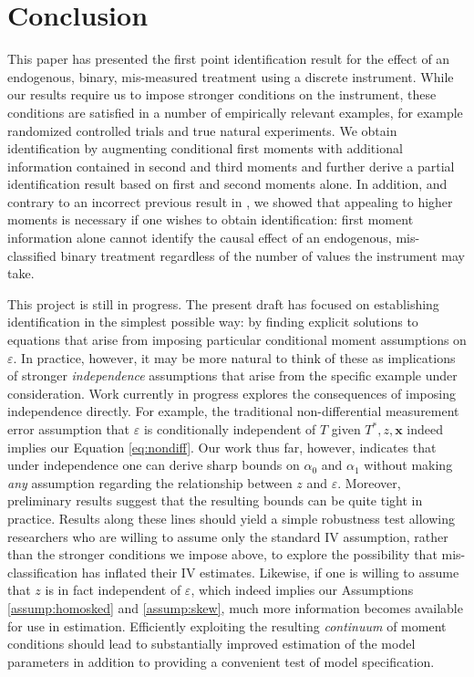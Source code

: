 \section{Conclusion}
This paper has presented the first point identification result for the effect of an endogenous, binary, mis-measured treatment using a discrete instrument.
While our results require us to impose stronger conditions on the instrument, these conditions are satisfied in a number of empirically relevant examples, for example randomized controlled trials and true natural experiments.
We obtain identification by augmenting conditional first moments with additional information contained in second and third moments and further derive a partial identification result based on first and second moments alone.
In addition, and contrary to an incorrect previous result in \cite{Mahajan}, we showed that appealing to higher moments is necessary if one wishes to obtain identification: first moment information alone cannot identify the causal effect of an endogenous, mis-classified binary treatment regardless of the number of values the instrument may take.

This project is still in progress.
The present draft has focused on establishing identification in the simplest possible way: by finding explicit solutions to equations that arise from imposing particular conditional moment assumptions on $\varepsilon$.
In practice, however, it may be more natural to think of these as implications of stronger \emph{independence} assumptions that arise from the specific example under consideration.
Work currently in progress explores the consequences of imposing independence directly.
For example, the traditional non-differential measurement error assumption that $\varepsilon$ is conditionally independent of $T$ given $T^*,z, \mathbf{x}$ indeed implies our Equation \ref{eq:nondiff}.
Our work thus far, however, indicates that under independence one can derive sharp bounds on $\alpha_0$ and $\alpha_1$ without making \emph{any} assumption regarding the relationship between $z$ and $\varepsilon$.
Moreover, preliminary results suggest that the resulting bounds can be quite tight in practice.
Results along these lines should yield a simple robustness test allowing researchers who are willing to assume only the standard IV assumption, rather than the stronger conditions we impose above, to explore the possibility that mis-classification has inflated their IV estimates. 
Likewise, if one is willing to assume that $z$ is in fact independent of $\varepsilon$, which indeed implies our Assumptions \ref{assump:homosked} and \ref{assump:skew}, much more information becomes available for use in estimation.
Efficiently exploiting the resulting \emph{continuum} of moment conditions should lead to substantially improved estimation of the model parameters in addition to providing a convenient test of model specification.

